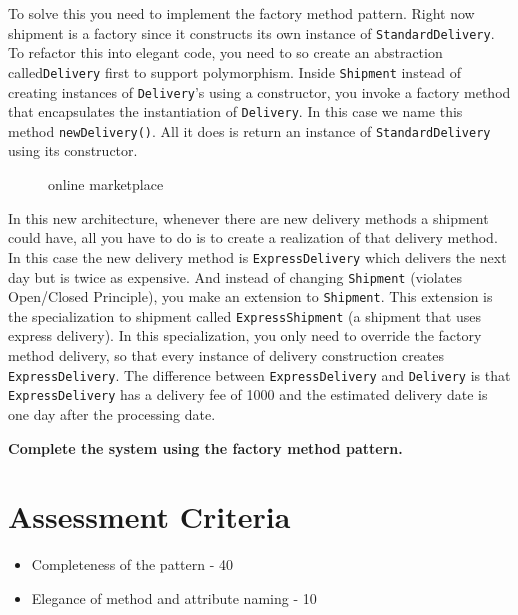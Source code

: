 To solve this you need to implement the factory method pattern. Right
now shipment is a factory since it constructs its own instance of
\texttt{StandardDelivery}. To refactor this into elegant code, you need
to so create an abstraction called\texttt{Delivery} first to support
polymorphism. Inside \texttt{Shipment} instead of creating instances of
\texttt{Delivery}'s using a constructor, you invoke a factory method
that encapsulates the instantiation of \texttt{Delivery}. In this case
we name this method \texttt{newDelivery()}. All it does is return an
instance of \texttt{StandardDelivery} using its constructor.

\begin{figure}
\centering
{}
\caption{online marketplace}
\end{figure}

In this new architecture, whenever there are new delivery methods a
shipment could have, all you have to do is to create a realization of
that delivery method. In this case the new delivery method is
\texttt{ExpressDelivery} which delivers the next day but is twice as
expensive. And instead of changing \texttt{Shipment} (violates
Open/Closed Principle), you make an extension to \texttt{Shipment}. This
extension is the specialization to shipment called
\texttt{ExpressShipment} (a shipment that uses express delivery). In
this specialization, you only need to override the factory method
delivery, so that every instance of delivery construction creates
\texttt{ExpressDelivery}. The difference between
\texttt{ExpressDelivery} and \texttt{Delivery} is that
\texttt{ExpressDelivery} has a delivery fee of 1000 and the estimated
delivery date is one day after the processing date.

\textbf{Complete the system using the factory method pattern.}

\section{Assessment
Criteria}\label{lab-exercise-8-shipment.md__assessment-criteria}

\begin{itemize}
\tightlist
\item
  Completeness of the pattern - 40
\item
  Elegance of method and attribute naming - 10
\end{itemize}
